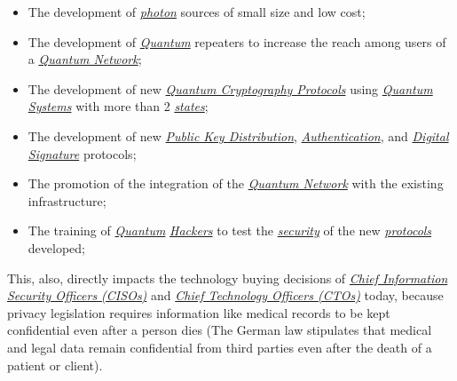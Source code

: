 \documentclass[conference]{IEEEtran}
\begin{document}
\begin{itemize}
    \item The development of \href{https://en.wikipedia.org/wiki/Photon}{\textit{photon}} sources of small size and low cost;
    \item The development of \href{https://en.wikipedia.org/wiki/Quantum}{\textit{Quantum}} repeaters to increase the reach among users of a \href{https://en.wikipedia.org/wiki/Quantum_network}{\textit{Quantum Network}};
    \item The development of new \href{https://en.wikipedia.org/wiki/List_of_quantum_key_distribution_protocols}{\textit{Quantum Cryptography Protocols}} using \href{https://en.wikipedia.org/wiki/Quantum_system}{\textit{Quantum Systems}} with more than 2 \href{https://en.wikipedia.org/wiki/Quantum_state}{\textit{states}};
    \item The development of new \href{https://en.wikipedia.org/wiki/Key_distribution}{\textit{Public Key Distribution}}, \href{https://en.wikipedia.org/wiki/Authentication}{\textit{Authentication}}, and \href{https://en.wikipedia.org/wiki/Digital_signature}{\textit{Digital Signature}} protocols;
    \item The promotion of the integration of the \href{https://en.wikipedia.org/wiki/Quantum_network}{\textit{Quantum Network}} with the existing infrastructure;
    \item The training of \href{https://en.wikipedia.org/wiki/Quantum}{\textit{Quantum}} \href{https://en.wikipedia.org/wiki/Hacker}{\textit{Hackers}} to test the \href{https://en.wikipedia.org/wiki/Internet_security}{\textit{security}} of the new \href{https://en.wikipedia.org/wiki/Cryptographic_protocol}{\textit{protocols}} developed;
\end{itemize}

\vspace{4pt}

This, also, directly impacts the technology buying decisions of \href{https://en.wikipedia.org/wiki/Chief_information_security_officer}{\textit{Chief Information Security Officers (CISOs)}} and \href{https://en.wikipedia.org/wiki/Chief_technology_officer}{\textit{Chief Technology Officers (CTOs)}} today, because privacy legislation requires information like medical records to be kept confidential even after a person dies (The German law stipulates that medical and legal data remain confidential from third parties even after the death of a patient or client).

\vspace{4pt}
\end{document}
